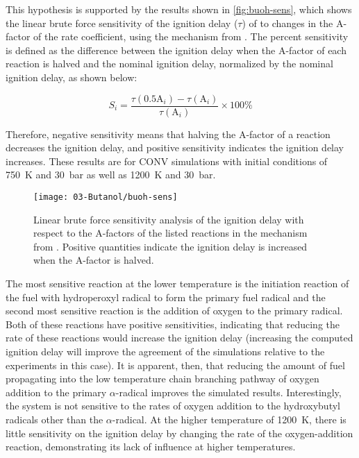 \documentclass[12pt, letterpaper]{article}
\begin{document}
This hypothesis is supported by the results shown in \autoref{fig:buoh-sens},
which shows the linear brute force sensitivity of the ignition delay ($\tau$)
of \iBuOH{} to changes in the $\mathrm{A}$-factor of the rate coefficient, using
the mechanism from \textcite{Sarathy2012}. The percent sensitivity is defined
as the difference between the ignition delay when the $\mathrm{A}$-factor of each reaction
is halved and the nominal ignition delay, normalized by the nominal ignition
delay, as shown below:

\begin{equation}
    \label{eq:buoh-sens}
    S_i=\frac{\tau(0.5\mathrm{A}_i )-\tau(\mathrm{A}_i )}{\tau(\mathrm{A}_i)} \times 100\%
\end{equation}

Therefore, negative sensitivity means that halving the $\mathrm{A}$-factor of a reaction
decreases the ignition delay, and positive sensitivity indicates the ignition
delay increases. These results are for CONV simulations with initial conditions
of \SI{750}{\kelvin} and \SI{30}{\bar} as well as \SI{1200}{\kelvin} and \SI{30}{\bar}.

\begin{figure}
    \texttt{[image: 03-Butanol/buoh-sens]}
    \caption{Linear brute force sensitivity analysis of the ignition delay with
        respect to the A-factors of the listed reactions in the mechanism from
        \textcite{Sarathy2012}. Positive quantities indicate the ignition delay
        is increased when the A-factor is halved.}
    \label{fig:buoh-sens}
\end{figure}

The most sensitive reaction at the lower temperature is the initiation reaction
of the fuel with hydroperoxyl radical to form the primary fuel radical and the
second most sensitive reaction is the addition of oxygen to the primary
radical. Both of these reactions have positive sensitivities, indicating that
reducing the rate of these reactions would increase the ignition delay
(increasing the computed ignition delay will improve the agreement of the
simulations relative to the experiments in this case). It is apparent, then,
that reducing the amount of fuel propagating into the low temperature chain
branching pathway of oxygen addition to the primary $\alpha$-radical improves
the simulated results. Interestingly, the \iBuOH{} system is not
sensitive to the rates of oxygen addition to the hydroxybutyl radicals other
than the $\alpha$-radical. At the higher temperature of \SI{1200}{\kelvin}, there is little
sensitivity on the ignition delay by changing the rate of the oxygen-addition
reaction, demonstrating its lack of influence at higher temperatures.
\end{document}
